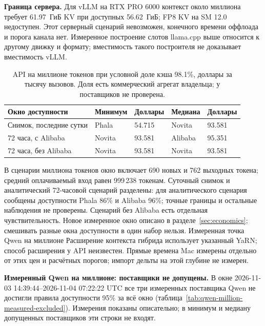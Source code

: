 \textbf{Граница сервера.} Для vLLM на RTX PRO 6000 контекст около миллиона требует 61.97~ГиБ KV
при доступных 56.62~ГиБ; FP8 KV на SM 12.0 недоступен.
Этот серверный сценарий невозможен, конечного времени оффлоада и порога канала нет.
Измеренное построение слотов llama.cpp выше относится к другому движку и формату;
вместимость такого построителя не доказывает вместимость vLLM.

\begin{table}[t]
\centering
\caption{API на миллионе токенов при условной доле кэша 98.1\%, доллары за тысячу вызовов.
Доля есть коммерческий агрегат владельца; у поставщиков не проверена.}
\label{tab:r22-million-api}
\footnotesize
\begin{tabular}{lllll}
\toprule
Окно доступности & Минимум & Доллары & Медиана & Доллары \\
\midrule
Снимок, последние сутки & Phala & 54.715 & Novita & 93.581 \\
72 часа, с Alibaba & Novita & 93.581 & Alibaba & 95.351 \\
72 часа, без Alibaba & Novita & 93.581 & Novita & 93.581 \\
\bottomrule
\end{tabular}
\end{table}

В сценарии миллиона токенов окно включает 690 новых и 762 выходных токена; средний оплачиваемый вход
равен 999\,238 токенам. Суточный снимок и аналитический 72-часовой сценарий разделены:
для аналитического сценария сообщены доступности Phala 86\% и Alibaba 96\%; точные границы и остальные наблюдения не проверены.
Сценарий без Alibaba есть отдельная чувствительность. Новое измеренное окно описано в разделе~\ref{sec:economics}; смешивать разные окна доступности в один набор нельзя.
Измеренная точка Qwen на миллионе  Расширение контекста гибрида использует указанный YaRN;
способ расширения у API неизвестен. Прямые времена Mac измерены отдельно от этих цен и расчётных порогов; импорт дельты на этой глубине не измерен.

\textbf{Измеренный Qwen на миллионе: поставщики не допущены.}
В окне 2026-11-03 14:39:44--2026-11-04 07:22:22 UTC все три измеренных поставщика Qwen
не достигли правила доступности 95\% за всё окно (таблица~\ref{tab:qwen-million-measured-excluded}).
Измерения показаны описательно; в минимум и медиану допущенных поставщиков эти строки не входят.

